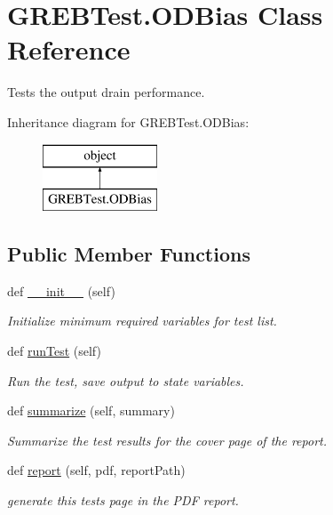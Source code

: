 \hypertarget{class_g_r_e_b_test_1_1_o_d_bias}{}\section{G\+R\+E\+B\+Test.\+O\+D\+Bias Class Reference}
\label{class_g_r_e_b_test_1_1_o_d_bias}


Tests the output drain performance.  


Inheritance diagram for G\+R\+E\+B\+Test.\+O\+D\+Bias\+:\begin{figure}[H]
\begin{center}
\leavevmode
\includegraphics[height=2.000000cm]{class_g_r_e_b_test_1_1_o_d_bias}
\end{center}
\end{figure}
\subsection*{Public Member Functions}
\begin{DoxyCompactItemize}
\item 
def \hyperlink{class_g_r_e_b_test_1_1_o_d_bias_a01492c0e86e8870c15cc01c1abea62ad}{\+\_\+\+\_\+init\+\_\+\+\_\+} (self)
\begin{DoxyCompactList}\small\item\em Initialize minimum required variables for test list. \end{DoxyCompactList}\item 
def \hyperlink{class_g_r_e_b_test_1_1_o_d_bias_aa1e6d3d8892c1b8645996cf77c556c02}{run\+Test} (self)
\begin{DoxyCompactList}\small\item\em Run the test, save output to state variables. \end{DoxyCompactList}\item 
def \hyperlink{class_g_r_e_b_test_1_1_o_d_bias_a4c886d6401c18d05a81626a3a8737ab2}{summarize} (self, summary)
\begin{DoxyCompactList}\small\item\em Summarize the test results for the cover page of the report. \end{DoxyCompactList}\item 
def \hyperlink{class_g_r_e_b_test_1_1_o_d_bias_a2679f544c5633c55ba9f714d4f1d6bfb}{report} (self, pdf, report\+Path)
\begin{DoxyCompactList}\small\item\em generate this test\textquotesingle{}s page in the P\+DF report. \end{DoxyCompactList}\end{DoxyCompactItemize}


